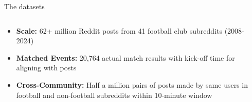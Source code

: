 \documentclass[10pt]{beamer}
\begin{document}
\begin{frame}{The datasets}

\begin{columns}
\begin{column}{0.6\textwidth}
\begin{itemize}
\item \textbf{Scale:} 62+ million Reddit posts from 41 football club subreddits (2008-2024)
\item \textbf{Matched Events:} 20,764 actual match results with kick-off time for aligning with posts
\item \textbf{Cross-Community:} Half a million pairs of posts made by same users in football and non-football subreddits within 10-minute window
\end{itemize}
\end{column}
\begin{column}{0.4\textwidth}
\centering
  \begin{table}
    \caption{Match-aligned posts overview.}
    \label{tab:match_posts}
  \end{table}
\end{column}
\end{columns}
    
\end{frame}

\end{document}
